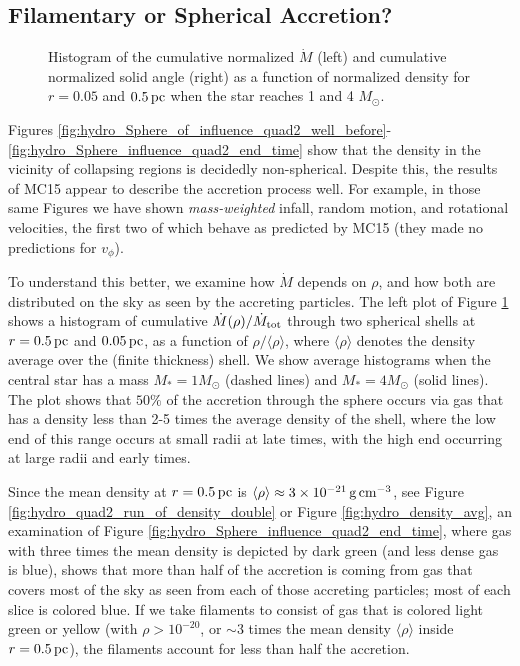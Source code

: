 \documentclass[../dissertation.tex]{subfiles}
\begin{document}
\subsection{Filamentary or Spherical Accretion?}
\begin{figure*}[htb]%
\caption[Hydro Normalized $\dot{M}$ and Normalized Solid Angle]{Histogram of the cumulative normalized $\dot{M}$ (left) and cumulative normalized solid angle (right) as a function of normalized density for $r=0.05$ and $0.5\,\rm pc$ when the star reaches 1 and 4 $M_{\odot}$. \label{fig:hydro_Accretion_avg}}
\end{figure*}

Figures 
\ref{fig:hydro_Sphere_of_influence_quad2_well_before}-\ref{fig:hydro_Sphere_influence_quad2_end_time} 
show that the density in the vicinity of collapsing regions
is decidedly non-spherical. Despite this, the results of MC15 appear to describe the 
accretion process well. For example, in those same Figures we have shown {\em mass-weighted} 
infall, random motion, and rotational velocities, the first two of which behave as predicted by
MC15 (they made no predictions for $v_\phi$). 

To understand this better, we examine how $\dot M$ depends on $\rho$, and how both
are distributed on the sky as seen by the accreting particles.
The left plot of Figure \ref{fig:hydro_Accretion_avg} shows a histogram of 
cumulative $\dot{M}(\rho)/\dot M_{\rm tot}$ through two spherical shells
at $r = 0.5 \,\rm pc$ and $0.05 \,\rm pc$, 
as a function of $\rho/\langle \rho\rangle$, where $\langle\rho\rangle$ 
denotes the density average over the (finite thickness) shell. 
We show average histograms when the central star has a mass $M_*=1M_\odot$ (dashed lines)
and $M_*=4M_\odot$ (solid lines).  The plot shows that $50\%$ of the accretion through the
sphere occurs via gas that has a density less than 2-5 times the average 
density of the shell,
where the low end of this range occurs at small radii at late times, with the high
end occurring at large radii and early times.

Since the mean density at $r=0.5\,\rm pc$ is 
$\langle\rho\rangle\approx 3\times10^{-21}\,\rm g\,\rm cm^{-3}$, see 
Figure \ref{fig:hydro_quad2_run_of_density_double} or Figure \ref{fig:hydro_density_avg}, an examination of 
Figure \ref{fig:hydro_Sphere_influence_quad2_end_time}, where gas with three times the 
mean density is depicted by dark green (and less dense gas is blue), shows that more than
half of the accretion is coming from gas that covers most of the sky as seen 
from each of those accreting particles; most of each slice is colored blue. If we take 
filaments to consist of gas that is
colored light green or yellow (with $\rho>10^{-20}$, or $\sim 3$ times 
the mean density $\langle\rho\rangle$ inside $r=0.5\,\rm pc$),
the filaments account for less than half the accretion.
\end{document}
